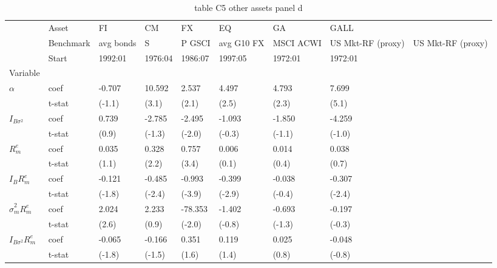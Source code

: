 \begin{table}[htbp]
  \centering
  \caption{table C5 other assets panel d}
  \label{tab:table_C5_other_assets_panel_d}
  \begin{tabular}{llllllll}
\toprule
 & Asset & FI & CM & FX & EQ & GA & GALL \\
 & Benchmark & avg bonds & S&P GSCI & avg G10 FX & MSCI ACWI & US Mkt-RF (proxy) & US Mkt-RF (proxy) \\
 & Start & 1992:01 & 1976:04 & 1986:07 & 1997:05 & 1972:01 & 1972:01 \\
Variable &  &  &  &  &  &  &  \\
\midrule
{} & coef & -0.707 & 10.592 & 2.537 & 4.497 & 4.793 & 7.699 \\
 & t-stat & (-1.1) & (3.1) & (2.1) & (2.5) & (2.3) & (5.1) \\
 & coef & 0.739 & -2.785 & -2.495 & -1.093 & -1.850 & -4.259 \\
 & t-stat & (0.9) & (-1.3) & (-2.0) & (-0.3) & (-1.1) & (-1.0) \\
 & coef & 0.035 & 0.328 & 0.757 & 0.006 & 0.014 & 0.038 \\
 & t-stat & (1.1) & (2.2) & (3.4) & (0.1) & (0.4) & (0.7) \\
 & coef & -0.121 & -0.485 & -0.993 & -0.399 & -0.038 & -0.307 \\
 & t-stat & (-1.8) & (-2.4) & (-3.9) & (-2.9) & (-0.4) & (-2.4) \\
 & coef & 2.024 & 2.233 & -78.353 & -1.402 & -0.693 & -0.197 \\
 & t-stat & (2.6) & (0.9) & (-2.0) & (-0.8) & (-1.3) & (-0.3) \\
 & coef & -0.065 & -0.166 & 0.351 & 0.119 & 0.025 & -0.048 \\
 & t-stat & (-1.8) & (-1.5) & (1.6) & (1.4) & (0.8) & (-0.8) \\
\bottomrule
\end{tabular}

\end{table}
